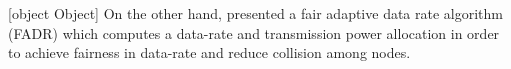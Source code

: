  \cite{barro_lorawan_nodate}    \newline 
 \cite{bouguera_energy_2018}    \newline 
 \cite{capuzzo_*confirmed_2018}    \newline 
 \cite{cuomo_towards_2018}    \newline 
 \cite{farhad_scalability_2019}    \newline 
 \cite{lavric_performance_2018}    \newline 
 \cite{marais_evaluating_2019}    \newline 
 \cite{marais_lora_2017}    \newline 
 \cite{montavont_enhanced_2018}    \newline 
 \cite{yang_smart_2018}    \newline 
 \cite{magrin_thorough_2019}   [object Object]   \newline 
 \cite{abdelfadeel_fair_2018}   On the other hand, \citet{abdelfadeel_fair_2018} presented a fair adaptive data rate algorithm (FADR) which computes a data-rate and transmission power allocation in order to achieve fairness in data-rate and reduce collision among nodes.   \newline 
